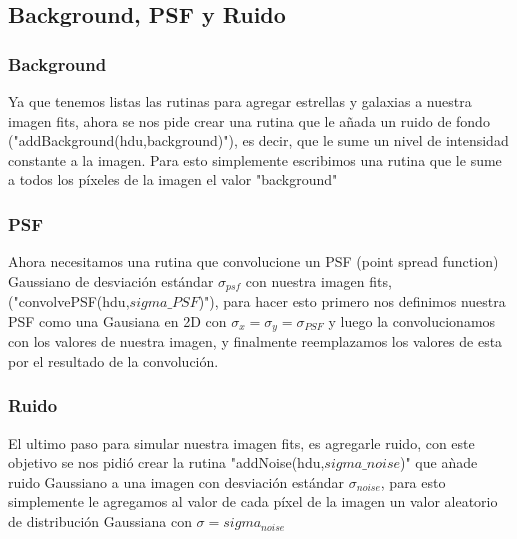 \documentclass[twocolumn]{AS4201}
\begin{document}
\subsection{Background, PSF y Ruido}
\subsubsection{Background}
Ya que tenemos listas las rutinas para agregar estrellas y galaxias a nuestra imagen fits, ahora se nos pide crear una rutina que le a\~nada un ruido de fondo ("addBackground(hdu,background)"), es decir, que le sume un nivel de intensidad constante a la imagen. Para esto simplemente escribimos una rutina que le sume a todos los píxeles de la imagen el valor "background"
\subsubsection{PSF}
Ahora necesitamos una rutina que convolucione un PSF (point spread function) Gaussiano de desviación estándar $\sigma_{psf}$ con nuestra imagen fits, ("convolvePSF(hdu,$sigma\_PSF$)"), para hacer esto primero nos definimos nuestra PSF como una Gausiana en 2D con $\sigma_x=\sigma_y=\sigma_{PSF}$ y luego la convolucionamos con los valores de nuestra imagen, y finalmente reemplazamos los valores de esta por el resultado de la convolución.
\subsubsection{Ruido}
El ultimo paso para simular nuestra imagen fits, es agregarle ruido, con este objetivo se nos pidió crear la rutina "addNoise(hdu,$sigma\_noise$)" que a\`nade ruido Gaussiano a una imagen con desviación estándar $\sigma_{noise}$, para esto simplemente le agregamos al valor de cada píxel de la imagen un valor aleatorio de distribución Gaussiana con $\sigma=sigma_{noise}$
\end{document}
